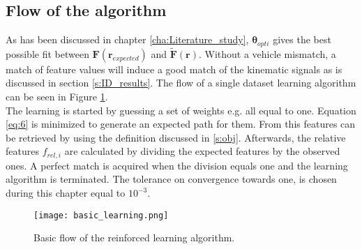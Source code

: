 \subsection{Flow of the algorithm}


As has been discussed in chapter \ref{cha:Literature_study},  $\bm{\theta}_{opti}$ gives the best possible fit between $\bm{F}(\bm{r}_{expected})$ and $\bm{\tilde{F}(\bm{r})}$.
Without a vehicle mismatch, a match of feature values will induce a good match of the kinematic signals as is discussed in section \ref{s:ID_results}.
The flow of a single dataset learning algorithm can be seen in Figure \ref{fig:basic learning}.\\


The learning is started by guessing a set of weights e.g. all equal to one. Equation \ref{eq:6} is minimized to generate an expected path for them. From this features can be retrieved by using the definition discussed in \ref{s:obj}. Afterwards, the relative features $f_{rel,i}$ are calculated by dividing the expected features by the observed ones. A perfect match is acquired when the division equals one and the learning algorithm is terminated. The tolerance on convergence towards one, is chosen during this chapter equal to $10^{-3}$.

\begin{figure}[h!]
	\centering
	\texttt{[image: basic\_learning.png]}
	\caption{Basic flow of the reinforced learning algorithm.}
	\label{fig:basic learning}
\end{figure}


